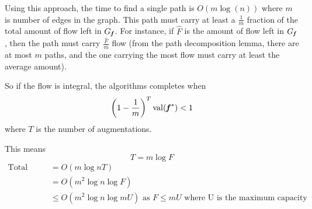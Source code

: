 Using this approach, the time to find a single path is $O(m \log(n))$ where $m$ is number of edges in the graph.
This path must carry at least a \( \frac{1}{m}\) fraction of the total
amount of flow left in \(G_{\boldsymbol{\mathit{f}}}\). For instance, if \(\hat{F}\) is
the amount of flow left in \(G_{\boldsymbol{\mathit{f}}}\), then the path must carry
\(\frac{\hat{F}}{m}\) flow (from the path decomposition lemma, there
are at most $m$ paths, and the one carrying the most flow must carry
at least the average amount).

So if the flow is integral, the algorithms completes when
\begin{equation}\nonumber
    \left( 1 - \frac{1}{m}\right)^T \operatorname*{val}(\boldsymbol{\mathit{f}}^*) < 1
\end{equation}
where $T$ is the number of augmentations.

This means
\begin{equation}\nonumber
    T = m \log{F}
\end{equation}
\begin{align*}
\text{Total time} &= O(m \log{n} T) \\
                  &= O(m^2 \log{n} \log{F})\\
                  &\leq O(m^2 \log{n} \log{mU}) \text { as }  F \leq m U \text{ where U is the maximum capacity}\\
\end{align*}

